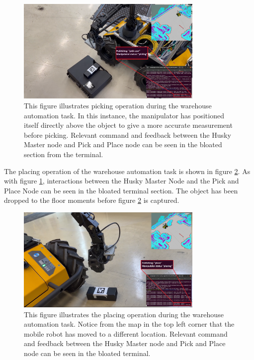 \begin{figure}[H]
  \centering
  \includegraphics[width = 0.8\textwidth]{Figures/figHuskyFinalExperiment2.png}
  \caption{This figure illustrates picking operation during the warehouse automation task. In this instance, the manipulator has positioned itself directly above the object to give a more accurate measurement before picking. Relevant command and feedback between the Husky Master node and Pick and Place node can be seen in the bloated section from the terminal.}
  \label{fig:R:WA:finalExperiment2}
\end{figure}


The placing operation of the warehouse automation task is shown in figure \ref{fig:R:WA:finalExperiment4}. As with figure \ref{fig:R:WA:finalExperiment2}, interactions between the Husky Master Node and the Pick and Place Node can be seen in the bloated terminal section. The object has been dropped to the floor moments before figure \ref{fig:R:WA:finalExperiment4} is captured.

\begin{figure}[H]
  \centering
  \includegraphics[width = 0.8\textwidth]{Figures/figHuskyFinalExperiment4.png}
  \caption{This figure illustrates the placing operation during the warehouse automation task. Notice from the map in the top left corner that the mobile robot has moved to a different location. Relevant command and feedback between the Husky Master node and Pick and Place node can be seen in the bloated terminal.}
  \label{fig:R:WA:finalExperiment4}
\end{figure}

